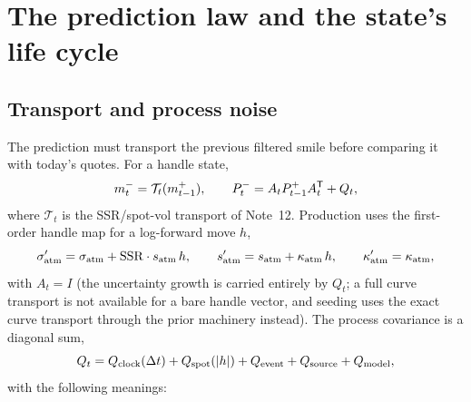 \documentclass[11pt]{article}
\begin{document}
\section{The prediction law and the state's life cycle}
\label{sec:prediction}

\subsection{Transport and process noise}

The prediction must transport the previous filtered smile before comparing it
with today's quotes. For a handle state,
\begin{equation}
m_t^-=\mathcal T_t(m_{t-1}^+),
\qquad
P_t^-=A_tP_{t-1}^+A_t^{\mathsf{T}}+Q_t,
\label{eq:transport}
\end{equation}
where $\mathcal T_t$ is the SSR/spot-vol transport of Note~12. Production uses
the first-order handle map for a log-forward move $h$,
\begin{equation}
\sigma_{\mathrm{atm}}'=\sigma_{\mathrm{atm}}+\mathrm{SSR}\cdot s_{\mathrm{atm}}\,h,
\qquad
s_{\mathrm{atm}}'=s_{\mathrm{atm}}+\kappa_{\mathrm{atm}}\,h,
\qquad
\kappa_{\mathrm{atm}}'=\kappa_{\mathrm{atm}},
\label{eq:transport-handles}
\end{equation}
with $A_t=I$ (the uncertainty growth is carried entirely by $Q_t$; a full
curve transport is not available for a bare handle vector, and seeding uses
the exact curve transport through the prior machinery instead). The process
covariance is a diagonal sum,
\begin{equation}
Q_t=Q_{\mathrm{clock}}(\Delta t)+Q_{\mathrm{spot}}(\lvert h\rvert)
+Q_{\mathrm{event}}+Q_{\mathrm{source}}+Q_{\mathrm{model}},
\label{eq:Q}
\end{equation}
with the following meanings:
\end{document}

